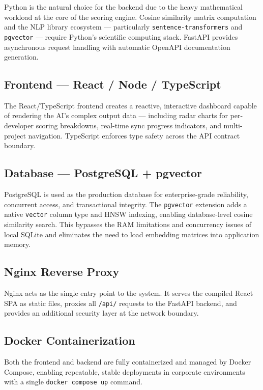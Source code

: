 \documentclass[12pt, a4paper]{article}
\begin{document}
Python is the natural choice for the backend due to the heavy mathematical workload at the core of the scoring engine. Cosine similarity matrix computation and the NLP library ecosystem — particularly \texttt{sentence-transformers} and \texttt{pgvector} — require Python's scientific computing stack. FastAPI provides asynchronous request handling with automatic OpenAPI documentation generation.

\subsection{Frontend — React / Node / TypeScript}

The React/TypeScript frontend creates a reactive, interactive dashboard capable of rendering the AI's complex output data — including radar charts for per-developer scoring breakdowns, real-time sync progress indicators, and multi-project navigation. TypeScript enforces type safety across the API contract boundary.

\subsection{Database — PostgreSQL + pgvector}

PostgreSQL is used as the production database for enterprise-grade reliability, concurrent access, and transactional integrity. The \texttt{pgvector} extension adds a native \texttt{vector} column type and HNSW indexing, enabling database-level cosine similarity search. This bypasses the RAM limitations and concurrency issues of local SQLite and eliminates the need to load embedding matrices into application memory.

\subsection{Nginx Reverse Proxy}

Nginx acts as the single entry point to the system. It serves the compiled React SPA as static files, proxies all \texttt{/api/} requests to the FastAPI backend, and provides an additional security layer at the network boundary.

\subsection{Docker Containerization}

Both the frontend and backend are fully containerized and managed by Docker Compose, enabling repeatable, stable deployments in corporate environments with a single \texttt{docker compose up} command.
\end{document}
